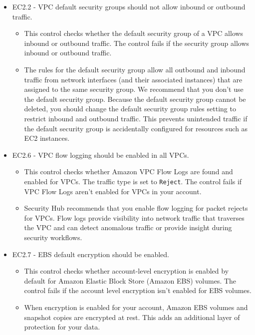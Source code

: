 \begin{mdframed}[backgroundcolor=gray!05, linecolor=gray!50]
\itshape
\begin{itemize}
    \item EC2.2 - VPC default security groups should not allow inbound or outbound traffic.
    \begin{itemize}
        \item This control checks whether the default security group of a VPC allows inbound or outbound traffic. The control fails if the security group allows inbound or outbound traffic.
        \item The rules for the default security group allow all outbound and inbound traffic from network interfaces (and their associated instances) that are assigned to the same security group. We recommend that you don't use the default security group. Because the default security group cannot be deleted, you should change the default security group rules setting to restrict inbound and outbound traffic. This prevents unintended traffic if the default security group is accidentally configured for resources such as EC2 instances.
    \end{itemize}
    \item EC2.6 - VPC flow logging should be enabled in all VPCs.
    \begin{itemize}
        \item This control checks whether Amazon VPC Flow Logs are found and enabled for VPCs. The traffic type is set to \texttt{Reject}. The control fails if VPC Flow Logs aren't enabled for VPCs in your account.
        \item Security Hub recommends that you enable flow logging for packet rejects for VPCs. Flow logs provide visibility into network traffic that traverses the VPC and can detect anomalous traffic or provide insight during security workflows.
    \end{itemize}
    \item EC2.7 - EBS default encryption should be enabled.
    \begin{itemize}
        \item This control checks whether account-level encryption is enabled by default for Amazon Elastic Block Store (Amazon EBS) volumes. The control fails if the account level encryption isn't enabled for EBS volumes.
        \item When encryption is enabled for your account, Amazon EBS volumes and snapshot copies are encrypted at rest. This adds an additional layer of protection for your data.

\end{itemize}
\end{itemize}
\end{mdframed}
